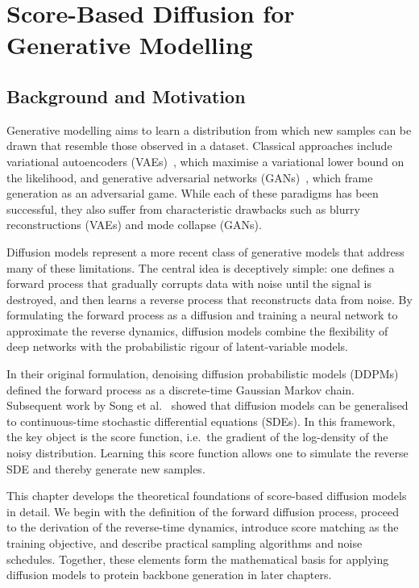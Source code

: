 \documentclass[a4paper,12pt]{article}
\begin{document}
\clearpage

\section{Score-Based Diffusion for Generative Modelling}\label{sec:SBD}
\subsection{Background and Motivation}
Generative modelling aims to learn a distribution from which new samples can be drawn that resemble those observed in a dataset. Classical approaches include variational autoencoders (VAEs)~\cite{kingma2022AutoEncodingVariationalBayes}, which maximise a variational lower bound on the likelihood, and generative adversarial networks (GANs)~\cite{goodfellow2020GenerativeAdversarialNetworks}, which frame generation as an adversarial game. While each of these paradigms has been successful, they also suffer from characteristic drawbacks such as blurry reconstructions (VAEs) and mode collapse (GANs).

Diffusion models represent a more recent class of generative models that address many of these limitations. The central idea is deceptively simple: one defines a forward process that gradually corrupts data with noise until the signal is destroyed, and then learns a reverse process that reconstructs data from noise. By formulating the forward process as a diffusion and training a neural network to approximate the reverse dynamics, diffusion models combine the flexibility of deep networks with the probabilistic rigour of latent-variable models. 

In their original formulation, denoising diffusion probabilistic models (DDPMs)~\cite{hoDenoisingDiffusionProbabilistic2020} defined the forward process as a discrete-time Gaussian Markov chain. Subsequent work by Song et al.~\cite{song2021ScoreBasedGenerativeModeling} showed that diffusion models can be generalised to continuous-time stochastic differential equations (SDEs). In this framework, the key object is the score function, i.e.~the gradient of the log-density of the noisy distribution. Learning this score function allows one to simulate the reverse SDE and thereby generate new samples.

This chapter develops the theoretical foundations of score-based diffusion models in detail. We begin with the definition of the forward diffusion process, proceed to the derivation of the reverse-time dynamics, introduce score matching as the training objective, and describe practical sampling algorithms and noise schedules. Together, these elements form the mathematical basis for applying diffusion models to protein backbone generation in later chapters.
\end{document}
